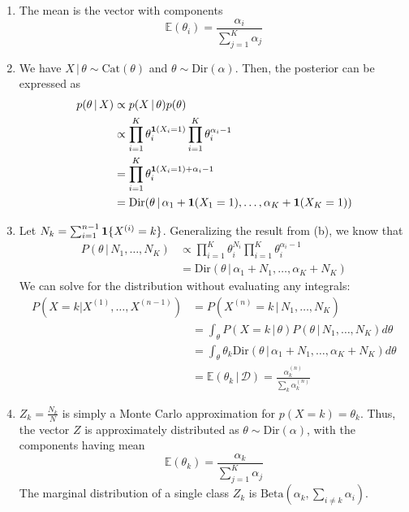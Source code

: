\documentclass[submit]{harvardml}
\newcommand{\given}{\,|\,}
\newcommand{\E}{\mathbb{E}}
\begin{document}
\begin{enumerate}[label=(\alph*)]
	\item The mean is the vector with components
	\[\E(\theta_i) = \frac{\alpha_i}{\sum_{j=1}^K \alpha_j}\]
	
	\item We have $X\given\theta\sim\text{Cat}(\theta)$ and $\theta\sim\text{Dir}(\alpha)$. Then, the posterior can be expressed as 
	\begin{align*}
	p(\theta\given X) & \propto p(X\given\theta) p(\theta) \\
	& \propto \prod_{i = 1}^{K} \theta_i^{\indicator(X_i = 1)} \prod_{i = 1}^{K} \theta_i^{\alpha_i - 1} \\
	&= \prod_{i = 1}^{K} \theta_i^{\indicator(X_i = 1) + \alpha_i - 1} \\
	&= \text{Dir}(\theta\given\alpha_1+\indicator(X_1 = 1),\dots,\alpha_K+\indicator(X_K = 1))
	\end{align*}
	
	\item Let $N_k = \sum_{i=1}^{n-1} \mathbf{1}\{X^{(i)} = k\}$. Generalizing the result from (b), we know that
	\begin{align*}
	P(\theta\given N_1,\ldots,N_K) & \propto \prod_{i = 1}^{K} \theta_i^{N_i} \prod_{i = 1}^{K} \theta_i^{\alpha_i - 1} \\
	&= \text{Dir}(\theta\given\alpha_1+N_1,\dots,\alpha_K+N_K)
	\end{align*}
	We can solve for the distribution without evaluating any integrals:
	\begin{align*}
	P(X = k | X^{(1)}, \ldots, X^{(n-1)}) &= P(X^{(n)} = k \given N_1, \ldots, N_K) \\
	&= \int_{\theta} P(X = k\given\theta) P(\theta\given N_1, \ldots, N_K) d\theta \\
	&= \int_{\theta} \theta_k \text{Dir}(\theta\given\alpha_1+N_1,\dots,\alpha_K+N_K) d\theta \\
	&= \E(\theta_k\given\mathcal{D}) = \frac{\alpha^{(n)}_{k}}{\sum_{k} \alpha^{(n)}_{k}}
	\end{align*}
	
	\item $Z_k = \frac{N_k}{N}$ is simply a Monte Carlo approximation for $p(X = k) = \theta_k$. Thus, the vector $Z$ is approximately distributed as $\theta\sim\text{Dir}(\alpha)$, with the components having mean 
	\[\E(\theta_k) = \frac{\alpha_k}{\sum_{j=1}^K \alpha_j}\]
	The marginal distribution of a single class $Z_k$ is $\text{Beta}(\alpha_k, \sum_{i\neq k}\alpha_i)$.
	

\end{enumerate}
\end{document}
